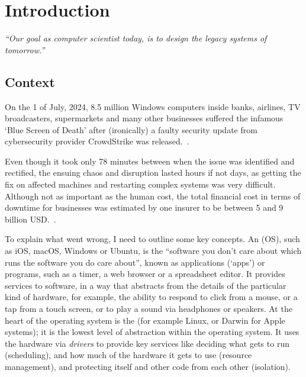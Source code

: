 \chapter{Introduction}\label{chap:intro}

\emph{“Our goal as computer scientist today, is to design the legacy systems of tomorrow.”}
\vspace{-1.5em}
\begin{flushright}
\end{flushright}

\margintoc%

\section{Context}

On the 1 of July, 2024, 8.5 million Windows computers inside banks, airlines, TV
broadcasters, supermarkets and many other businesses suffered the infamous `Blue Screen of
Death' after (ironically) a faulty security update from cybersecurity
provider CrowdStrike was released.~.

Even though it took only 78 minutes between when the issue was identified and
rectified, the ensuing chaos and disruption lasted hours if not days, as getting
the fix on affected machines and restarting complex systems was very difficult.
Although not as important as the human cost, the total financial cost in terms
of downtime for businesses was estimated by one insurer to be between 5 and 9
billion USD.~.

To explain what went wrong, I need to outline some key concepts. An
 (OS), such as iOS, macOS, Windows or Ubuntu, is
the ``software you don't care about which runs the software you do care
about'', known as applications (`apps') or programs, such as a timer, a web
browser or a spreadsheet editor. It provides services to software, in a way
that abstracts from the details of the particular kind of hardware, for
example, the ability to respond to click from a mouse, or a tap from a touch
screen, or to play a sound via headphones or speakers. At the heart of the
operating system is the  (for example Linux, or Darwin for
Apple systems); it is the lowest level of abstraction within the operating
system. It uses the hardware via \emph{drivers} to provide key services like
deciding what gets to run (scheduling), and how much of the hardware it gets to
use (resource management), and protecting itself and other code from each other
(isolation).

